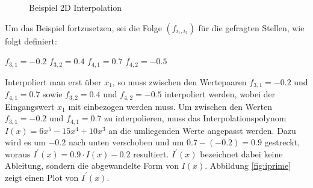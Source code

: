 \documentclass[11pt,a4paper]{article}
\begin{document}
\begin{figure}[!ht]
\centering
{}
\caption[Beispiel 2D Interpolation]{Beispiel 2D Interpolation}
\label{fig:PerlinNoiseBeispiel2DInterpolation}
\end{figure}
\noindent
Um das Beispiel fortzusetzen, sei die Folge $(f_{i_1, i_2})$ für die gefragten Stellen, wie folgt definiert:
\begin{center}
$f_{3, 1} = -0.2$ \hspace{10pt} $f_{3, 2} = 0.4$ \hspace{10pt} $f_{4, 1} = 0.7$ \hspace{10pt} $f_{4, 2} = -0.5$\\
\end{center}
\noindent
Interpoliert man erst über $x_1$, so muss zwischen den Wertepaaren $f_{3, 1} = -0.2$ und $f_{4, 1} = 0.7$ sowie $f_{3, 2} = 0.4$ und $f_{4, 2} = -0.5$ interpoliert werden, wobei der Eingangswert $x_1$ mit einbezogen werden muss. Um zwischen den Werten $f_{3, 1} = -0.2$ und $f_{4, 1} = 0.7$ zu interpolieren, muss das Interpolationspolynom $I(x) = 6x^5-15x^4+10x^3$ an die umliegenden Werte angepasst werden. Dazu wird es um $-0.2$ nach unten verschoben und um $0.7 - (-0.2) = 0.9$ gestreckt, woraus $I^\prime(x) = 0.9 \cdot I(x) - 0.2$ resultiert. $I^\prime(x)$ bezeichnet dabei keine Ableitung, sondern die abgewandelte Form von $I(x)$. Abbildung \ref{fig:iprime} zeigt einen Plot von $I^\prime(x)$.
\end{document}
